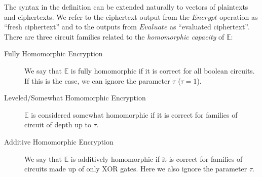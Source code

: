 The syntax in the definition can be extended naturally to vectors of plaintexts
and ciphertexts. We refer to the ciphertext output from the \(Encrypt\)
operation as ``fresh ciphertext'' and to the outputs from \(Evaluate\) as ``evaluated
ciphertext''. There are three circuit families related to the \textit{homomorphic capacity } of \(\mathbb{E}\):
\begin{description}
\item[Fully Homomorphic Encryption] We say that \(\mathbb{E}\) is fully
  homomorphic if it is correct for all boolean circuits. If this is the case, we can
  ignore the parameter \(\tau\) (\(\tau = 1\)).
\item[Leveled/Somewhat Homomorphic Encryption] \(\mathbb{E}\) is considered
  somewhat homomorphic if it is correct for families of circuit of depth up to
  \(\tau\).
\item[Additive Homomorphic Encryption] We say that \(\mathbb{E}\) is additively
  homomorphic if it is correct for families of circuits made up of only XOR
  gates. Here we also ignore the parameter \(\tau\).
\end{description}


